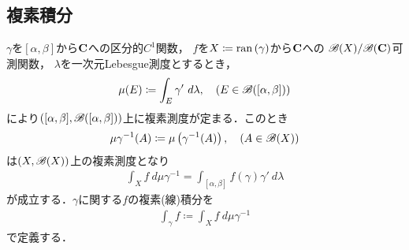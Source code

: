 \subsection{複素積分}
	$\gamma$を$[\alpha,\beta]$から$\mathbf{C}$への区分的$C^1$関数，
	$f$を$X \coloneqq \operatorname*{ran} \left(\gamma\right)$から$\mathbf{C}$への
	$\mathscr{B}(X)/\mathscr{B}(\mathbf{C})$可測関数，
	$\lambda$を一次元Lebesgue測度とするとき，
	\begin{align}
		\mu(E) \coloneqq \int_E \gamma'\ d\lambda,
		\quad (E \in \mathscr{B}([\alpha,\beta]))
	\end{align}
	により$([\alpha,\beta],\mathscr{B}([\alpha,\beta]))$上に複素測度が定まる．このとき
	\begin{align}
		\mu \gamma^{-1}(A) \coloneqq \mu\left( \gamma^{-1}(A) \right),
		\quad (A \in \mathscr{B}(X))
	\end{align}
	は$(X,\mathscr{B}(X))$上の複素測度となり
	\begin{align}
		\int_X f\ d\mu \gamma^{-1} = \int_{[\alpha,\beta]} f(\gamma) \gamma'\ d\lambda
	\end{align}
	が成立する．$\gamma$に関する$f$の複素(線)積分を
	\begin{align}
		\int_\gamma f \coloneqq \int_X f\ d\mu \gamma^{-1}
	\end{align}
	で定義する．